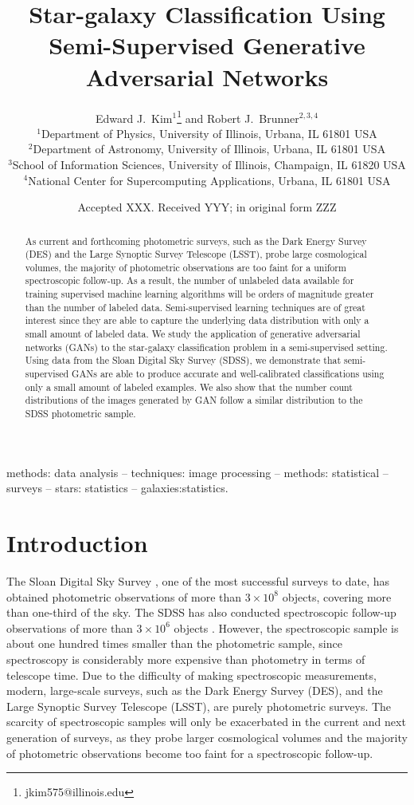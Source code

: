 \documentclass[fleqn,usenatbib]{mnras}
\title[Star-galaxy Classification Using GANs]{Star-galaxy Classification Using Semi-Supervised Generative Adversarial Networks}
\author[E. J. Kim and R. J. Brunner]{
  Edward J.~Kim$^1$\thanks{jkim575@illinois.edu} and Robert J.~Brunner$^{2,3,4}$ \\
$^1$Department of Physics, University of Illinois, Urbana, IL 61801 USA\\
$^2$Department of Astronomy, University of Illinois, Urbana, IL 61801 USA\\
$^3$School of Information Sciences, University of Illinois, Champaign, IL 61820 USA\\
$^4$National Center for Supercomputing Applications, Urbana, IL 61801 USA\\
}
\date{Accepted XXX. Received YYY; in original form ZZZ}
\begin{document}
\label{firstpage}
\pagerange{\pageref{firstpage}--\pageref{lastpage}}
\maketitle

\begin{abstract}
As current and forthcoming photometric surveys, such as the Dark Energy Survey (DES) and the Large Synoptic Survey Telescope (LSST),
probe large cosmological volumes, the majority of photometric observations are too faint for a uniform spectroscopic follow-up.
As a result, the number of unlabeled data available for training supervised machine learning algorithms will be orders of magnitude
greater than the number of labeled data.
Semi-supervised learning techniques are of great interest since they are able to capture the underlying data distribution
with only a small amount of labeled data.
We study the application of generative adversarial networks (GANs) to the star-galaxy classification problem
in a semi-supervised setting.
Using data from the Sloan Digital Sky Survey (SDSS), we demonstrate that semi-supervised GANs are able to produce
accurate and well-calibrated classifications using only a small amount of labeled examples.
We also show that the number count distributions of the images generated by GAN follow a similar distribution to
the SDSS photometric sample.
\end{abstract}

\begin{keywords}
methods: data analysis -- techniques: image processing -- methods: statistical
-- surveys -- stars: statistics -- galaxies:statistics.
\end{keywords}

\section{Introduction}
  \label{sec:introduction}

The Sloan Digital Sky Survey \citep[SDSS;][]{york2000sloan}, one of the most successful surveys to date,
has obtained photometric observations of more than $3 \times 10^8$ objects, covering more than one-third of
the sky.
The SDSS has also conducted spectroscopic follow-up observations of more than $3 \times 10^6$
objects \citep{eisenstein2011sdss}.
However, the spectroscopic sample is about one hundred times smaller than the photometric sample,
since spectroscopy is considerably more expensive than photometry in terms of telescope time.
Due to the difficulty of making spectroscopic measurements,
modern, large-scale surveys, such as the Dark Energy Survey (DES),
and the Large Synoptic Survey Telescope (LSST), are purely photometric surveys.
The scarcity of spectroscopic samples will only be exacerbated in the current and next generation of surveys,
as they probe larger cosmological volumes and the majority of photometric observations become too faint
for a spectroscopic follow-up.
\end{document}
